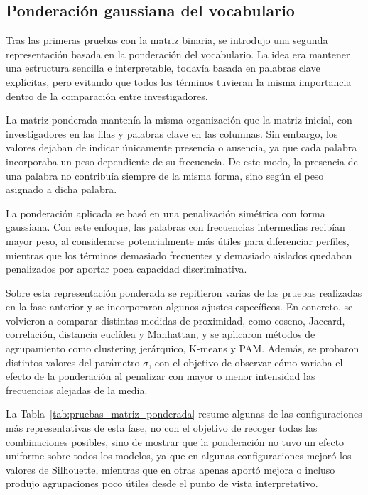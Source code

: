 \documentclass[11pt,spanish,listoffigures,listoftables]{tfgetsinf}
\begin{document}
\subsection{Ponderación gaussiana del vocabulario}

Tras las primeras pruebas con la matriz binaria, se introdujo una segunda representación basada en la ponderación del vocabulario. La idea era mantener una estructura sencilla e interpretable, todavía basada en palabras clave explícitas, pero evitando que todos los términos tuvieran la misma importancia dentro de la comparación entre investigadores.

La matriz ponderada mantenía la misma organización que la matriz inicial, con investigadores en las filas y palabras clave en las columnas. Sin embargo, los valores dejaban de indicar únicamente presencia o ausencia, ya que cada palabra incorporaba un peso dependiente de su frecuencia. De este modo, la presencia de una palabra no contribuía siempre de la misma forma, sino según el peso asignado a dicha palabra.

La ponderación aplicada se basó en una penalización simétrica con forma gaussiana. Con este enfoque, las palabras con frecuencias intermedias recibían mayor peso, al considerarse potencialmente más útiles para diferenciar perfiles, mientras que los términos demasiado frecuentes y demasiado aislados quedaban penalizados por aportar poca capacidad discriminativa.

Sobre esta representación ponderada se repitieron varias de las pruebas realizadas en la fase anterior y se incorporaron algunos ajustes específicos. En concreto, se volvieron a comparar distintas medidas de proximidad, como coseno, Jaccard, correlación, distancia euclídea y Manhattan, y se aplicaron métodos de agrupamiento como clustering jerárquico, K-means y PAM. Además, se probaron distintos valores del parámetro \(\sigma\), con el objetivo de observar cómo variaba el efecto de la ponderación al penalizar con mayor o menor intensidad las frecuencias alejadas de la media.

La Tabla~\ref{tab:pruebas_matriz_ponderada} resume algunas de las configuraciones más representativas de esta fase, no con el objetivo de recoger todas las combinaciones posibles, sino de mostrar que la ponderación no tuvo un efecto uniforme sobre todos los modelos, ya que en algunas configuraciones mejoró los valores de Silhouette, mientras que en otras apenas aportó mejora o incluso produjo agrupaciones poco útiles desde el punto de vista interpretativo.
\end{document}
